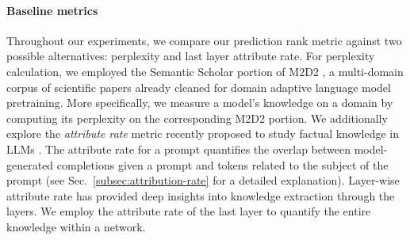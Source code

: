 \documentclass[10pt]{article}
\begin{document}
\paragraph{Baseline metrics}
Throughout our experiments, we compare our prediction rank metric against two possible alternatives: perplexity and last layer attribute rate.
For perplexity calculation, we employed the Semantic Scholar portion of M2D2 \citep{reid2022m2d2}, a multi-domain corpus of scientific papers already cleaned for domain adaptive language model pretraining. More specifically, we measure a model's knowledge on a domain by computing its perplexity on the corresponding M2D2 portion.
We additionally explore the \emph{attribute rate} metric recently proposed to study factual knowledge in LLMs \citep{geva2023dissecting}. The attribute rate for a prompt quantifies the overlap between model-generated completions given a prompt and tokens related to the subject of the prompt (see Sec.~\ref{subsec:attribution-rate} for a detailed explanation). Layer-wise attribute rate has provided deep insights into knowledge extraction through the layers. We employ the attribute rate of the last layer to quantify the entire knowledge within a network.


\end{document}
